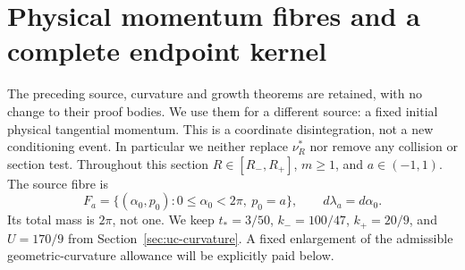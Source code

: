 \section{Physical momentum fibres and a complete endpoint kernel}
\label{sec:mc-fibres}
The preceding source, curvature and growth theorems are retained, with
no change to their proof bodies. We use them for a different source:
a fixed initial physical tangential momentum. This is a coordinate
disintegration, not a new conditioning event. In particular we neither
replace $\nu_R^*$ nor remove any collision or section test.
Throughout this section $R\in[R_-,R_+]$, $m\ge1$, and
$a\in(-1,1)$. The source fibre is
\[
       F_a=\{(\alpha_0,p_0):0\le\alpha_0<2\pi,\ p_0=a\},
       \qquad d\lambda_a=d\alpha_0.
\]
Its total mass is $2\pi$, not one. We keep $t_*=3/50$,
$k_-=100/47$, $k_+=20/9$, and $U=170/9$ from
Section~\ref{sec:uc-curvature}. A fixed enlargement of the admissible
geometric-curvature allowance will be explicitly paid below.


